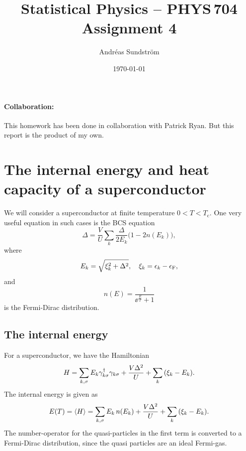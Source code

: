 \documentclass[11pt,letter, swedish, english
]{article}
\newcommand{\Tc}{\ensuremath{T_{\text{c}}}}
\newcommand{\eF}{\ensuremath{\epsilon_{\text{F}}}}
\begin{document}




\title{Statistical Physics -- PHYS\,704 \\
Assignment 4}
\author{Andréas Sundström}
\date{\today}

\maketitle

\paragraph{Collaboration: } This homework has been done in
collaboration with Patrick Ryan. But this report is the product of my
own. 

\section{The internal energy and heat capacity of a superconductor}
We will consider a superconductor at finite temperature $0<T<\Tc$. One
very useful equation in such cases is the BCS equation
\begin{equation}\label{eq:BCS}
\Delta=\frac{V}{U}\sum_k \frac{\Delta}{2E_k}\Big(1-2n(E_k)\Big),
\end{equation}
where
\begin{equation}
E_k=\sqrt{\xi_k^2+\Delta^2}\qcomma \xi_k=\epsilon_k-\eF,
\end{equation}
and
\begin{equation}\label{eq:nFD}
n(E)=\frac{1}{\ee^{\frac{E}{T}}+1}
\end{equation}
is the Fermi-Dirac distribution.

\subsection{The internal energy}
For a superconductor, we have the Hamiltonian
\begin{equation}
H=\sum_{k, \sigma} E_k\gamma_{k \sigma}^\dagger\gamma_{k \sigma}
+\frac{V\Delta^2}{U}+\sum_k\qty(\xi_k-E_k).
\end{equation}
The internal energy is given as
\begin{equation}\label{eq:1a_E0}
E(T)=\ev{H}=
\sum_{k, \sigma} E_k\,n(E_k)
+\frac{V\Delta^2}{U}+\sum_k\qty(\xi_k-E_k).
\end{equation}
The number-operator for the quasi-particles in the first term is
converted to a Fermi-Dirac distribution, since the quasi particles are
an ideal Fermi-gas. 
\end{document}
